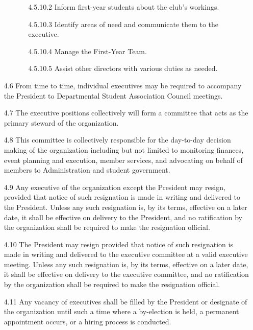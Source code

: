 \documentclass[12pt,a4paper]{article}
\begin{document}
\begin{enumerate}
\begin{enumerate}
\begin{enumerate}
\item[4.5.10.2] Inform first-year students about the club's workings.

\item[4.5.10.3] Identify areas of need and communicate them to the executive.

\item[4.5.10.4] Manage the First-Year Team.

\item[4.5.10.5] Assist other directors with various duties as needed.
\end{enumerate}
\end{enumerate}

\item[4.6] From time to time, individual executives may be required to accompany the President to Departmental Student Association Council meetings.

\item[4.7] The executive positions collectively will form a committee that acts as the primary steward of the organization.

\item[4.8] This committee is collectively responsible for the day-to-day decision making of the organization including but not limited to monitoring finances, event planning and execution, member services, and advocating on behalf of members to Administration and student government.

\item[4.9] Any executive of the organization except the President may resign, provided that notice of such resignation is made in writing and delivered to the President. Unless any such resignation is, by its terms, effective on a later date, it shall be effective on delivery to the President, and no ratification by the organization shall be required to make the resignation official.

\item[4.10] The President may resign provided that notice of such resignation is made in writing and delivered to the executive committee at a valid executive meeting. Unless any such resignation is, by its terms, effective on a later date, it shall be effective on delivery to the executive committee, and no ratification by the organization shall be required to make the resignation official.

\item[4.11] Any vacancy of executives shall be filled by the President or designate of the organization until such a time where a by-election is held, a permanent appointment occurs, or a hiring process is conducted.


\end{enumerate}
\end{document}
